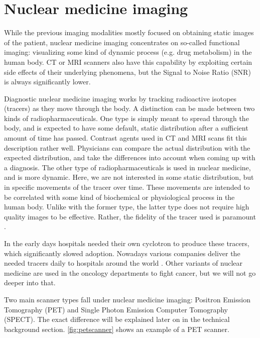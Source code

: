 \section{Nuclear medicine imaging}\label{chap:nuclearimg}
While the previous imaging modalities mostly focused on obtaining static images
of the patient, nuclear medicine imaging concentrates on so-called functional
imaging: visualizing some kind of dynamic process (e.g. drug metabolism) in the
human body. CT or MRI scanners also have this capability by exploiting certain
side effects of their underlying phenomena, but the Signal to Noise Ratio (SNR)
is always significantly lower.

Diagnostic nuclear medicine imaging works by tracking radioactive isotopes
(tracers) as they move through the body. A distinction can be made between two
kinds of radiopharmaceuticals. One type is simply meant to spread through the
body, and is expected to have some default, static distribution after a
sufficient amount of time has passed. Contrast agents used in CT and MRI scans
fit this description rather well. Physicians can compare the actual
distribution with the expected distribution, and take the differences into
account when coming up with a diagnosis. The other type of radiopharmaceuticals is used
in nuclear medicine, and is more dynamic. Here, we are not interested in some
static distribution, but in specific movements of the tracer over time. These
movements are intended to be correlated with some kind of biochemical or
physiological process in the human body. Unlike with the former type, the latter
type does not require high quality images to be effective. Rather, the fidelity
of the tracer used is paramount \cite{radiopharma}.

In the early days hospitals needed their own cyclotron to produce these tracers,
which significantly slowed adoption. Nowadays various companies deliver the
needed tracers daily to hospitals around the world \cite{petreview}. Other
variants of nuclear medicine are used in the oncology departments to fight
cancer, but we will not go deeper into that.

Two main scanner types fall under nuclear medicine imaging: Positron Emission
Tomography (PET) and Single Photon Emission Computer Tomography (SPECT). The
exact difference will be explained later on in the technical background section.
\autoref{fig:petscanner} shows an example of a PET scanner.

